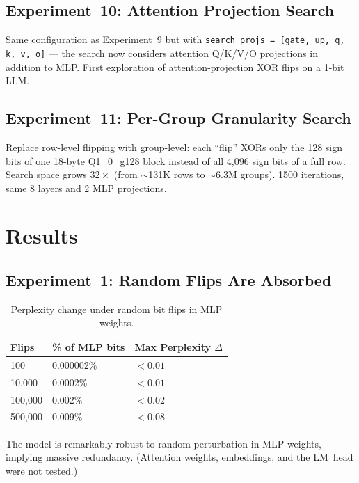 \documentclass[11pt,a4paper]{article}
\begin{document}
\subsection{Experiment~10: Attention Projection Search}

Same configuration as Experiment~9 but with
\texttt{search\_projs = [gate, up, q, k, v, o]} --- the search now
considers attention Q/K/V/O projections in addition to MLP. First
exploration of attention-projection XOR flips on a 1-bit LLM.

\subsection{Experiment~11: Per-Group Granularity Search}

Replace row-level flipping with group-level: each ``flip'' XORs only
the 128 sign bits of one 18-byte Q1\_0\_g128 block instead of all
4,096 sign bits of a full row. Search space grows $32\times$ (from
$\sim$131K rows to $\sim$6.3M groups). 1500 iterations, same 8 layers
and 2 MLP projections.

\section{Results}

\subsection{Experiment~1: Random Flips Are Absorbed}

\begin{table}[h]
\centering
\caption{Perplexity change under random bit flips in MLP weights.}
\begin{tabular}{@{}lll@{}}
\toprule
Flips & \% of MLP bits & Max Perplexity $\Delta$ \\
\midrule
100     & 0.000002\% & $< 0.01$ \\
10,000  & 0.0002\%   & $< 0.01$ \\
100,000 & 0.002\%    & $< 0.02$ \\
500,000 & 0.009\%    & $< 0.08$ \\
\bottomrule
\end{tabular}
\end{table}

The model is remarkably robust to random perturbation in MLP weights,
implying massive redundancy. (Attention weights, embeddings, and the
LM~head were not tested.)
\end{document}
